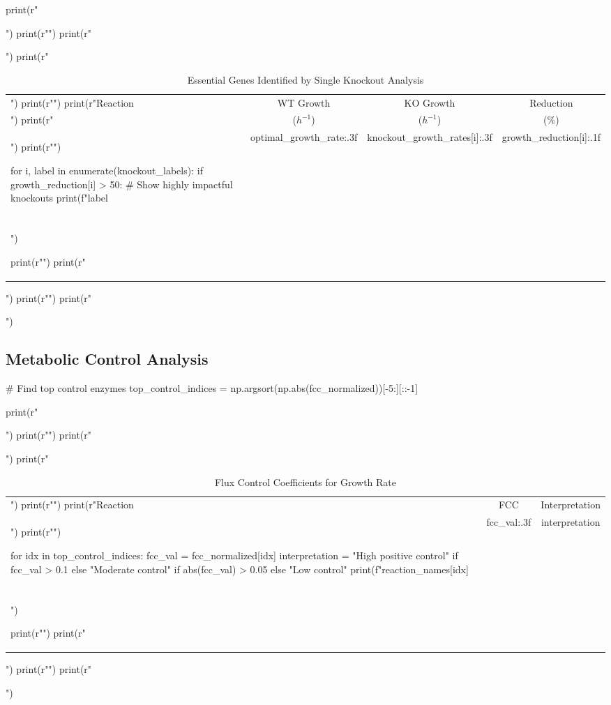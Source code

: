 \documentclass[a4paper, 11pt]{article}
\begin{document}
\begin{pycode}
print(r"\begin{table}[htbp]")
print(r"\centering")
print(r"\caption{Essential Genes Identified by Single Knockout Analysis}")
print(r"\begin{tabular}{lccc}")
print(r"\toprule")
print(r"Reaction & WT Growth & KO Growth & Reduction \\")
print(r" & ($h^{-1}$) & ($h^{-1}$) & (\%) \\")
print(r"\midrule")

for i, label in enumerate(knockout_labels):
    if growth_reduction[i] > 50:  # Show highly impactful knockouts
        print(f"{label} & {optimal_growth_rate:.3f} & {knockout_growth_rates[i]:.3f} & {growth_reduction[i]:.1f} \\\\")

print(r"\bottomrule")
print(r"\end{tabular}")
print(r"\label{tab:essentiality}")
print(r"\end{table}")
\end{pycode}

\subsection{Metabolic Control Analysis}

\begin{pycode}
# Find top control enzymes
top_control_indices = np.argsort(np.abs(fcc_normalized))[-5:][::-1]

print(r"\begin{table}[htbp]")
print(r"\centering")
print(r"\caption{Flux Control Coefficients for Growth Rate}")
print(r"\begin{tabular}{lcc}")
print(r"\toprule")
print(r"Reaction & FCC & Interpretation \\")
print(r"\midrule")

for idx in top_control_indices:
    fcc_val = fcc_normalized[idx]
    interpretation = "High positive control" if fcc_val > 0.1 else "Moderate control" if abs(fcc_val) > 0.05 else "Low control"
    print(f"{reaction_names[idx]} & {fcc_val:.3f} & {interpretation} \\\\")

print(r"\bottomrule")
print(r"\end{tabular}")
print(r"\label{tab:mca}")
print(r"\end{table}")
\end{pycode}
\end{document}
